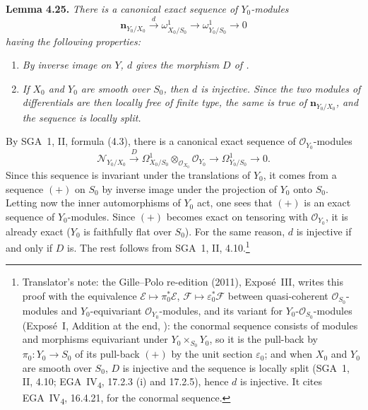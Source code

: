 \medskip
\noindent{}\textbf{Lemma 4.25.}
\textit{There is a canonical exact sequence of \(Y_0\)-modules}
\[
 \tag{+}\label{sga3:iii:lemma:4-25:equation:plus}
 \mathbf n_{Y_0/X_0}
 \xrightarrow{d}
 \omega^1_{X_0/S_0}
 \longrightarrow
 \omega^1_{Y_0/S_0}
 \longrightarrow 0
\]
\textit{having the following properties:}
\begin{enumerate}
\item[\SGAInlineRefTarget{sga3:iii:lemma:4-25:item:i}(i)] \textit{By inverse image on \(Y\), \(d\) gives the morphism
  \(D\) of .}
\item[\SGAInlineRefTarget{sga3:iii:lemma:4-25:item:ii}(ii)] \textit{If \(X_0\) and \(Y_0\) are smooth over \(S_0\), then
  \(d\) is injective. Since the two modules of differentials are then
  locally free of finite type, the same is true of
  \(\mathbf n_{Y_0/X_0}\), and the sequence is locally split.}
\end{enumerate}

By SGA~1, II, formula (4.3), there is a canonical exact sequence of
\(\mathscr O_{Y_0}\)-modules
\[
 \mathscr N_{Y_0/X_0}
 \xrightarrow{D}
 \Omega^1_{X_0/S_0}\otimes_{\mathscr O_{X_0}}\mathscr O_{Y_0}
 \longrightarrow
 \Omega^1_{Y_0/S_0}
 \longrightarrow 0.
\]
Since this sequence is invariant under the translations of \(Y_0\), it
comes from a sequence \((+)\) on \(S_0\) by inverse image under the
projection of \(Y_0\) onto \(S_0\). Letting now the inner automorphisms of
\(Y_0\) act, one sees that \((+)\) is an exact sequence of
\(Y_0\)-modules. Since \((+)\) becomes exact on tensoring with
\(\mathscr O_{Y_0}\), it is already exact (\(Y_0\) is faithfully flat over
\(S_0\)). For the same reason, \(d\) is injective if and only if \(D\) is.
The rest follows from SGA~1, II, 4.10.\footnote{Translator's note: the Gille--Polo re-edition (2011), Exposé~III, writes
this proof with the equivalence \(\mathscr E\mapsto\pi_0^*\mathscr E\),
\(\mathscr F\mapsto\varepsilon_0^*\mathscr F\) between quasi-coherent
\(\mathscr O_{S_0}\)-modules and \(Y_0\)-equivariant \(\mathscr O_{Y_0}\)-modules,
and its variant for \(Y_0\)-\(\mathscr O_{S_0}\)-modules (Exposé~I, Addition at
the end, ): the conormal sequence consists of modules and morphisms
equivariant under \(Y_0\times_{S_0}Y_0\), so it is the pull-back by
\(\pi_0\colon Y_0\to S_0\) of its pull-back \((+)\) by the unit section
\(\varepsilon_0\); and when \(X_0\) and \(Y_0\) are smooth over \(S_0\), \(D\) is
injective and the sequence is locally split (SGA~1, II, 4.10;
EGA~IV\textsubscript{4}, 17.2.3 (i) and 17.2.5), hence \(d\) is injective. It
cites EGA~IV\textsubscript{4}, 16.4.21, for the conormal sequence.}


